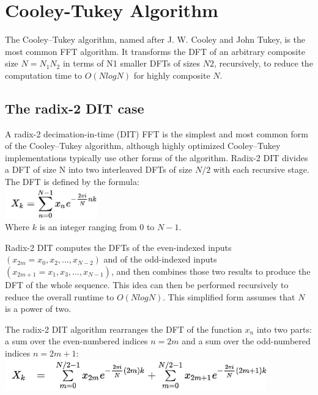 \documentclass[12pt,a4paper]{article}
\begin{document}
\section{Cooley-Tukey Algorithm}\label{sec2}
\hspace{0.5cm} The Cooley–Tukey algorithm, named after J. W. Cooley and John Tukey, is the most common FFT algorithm. It transforms the DFT of an arbitrary composite size $N=N_{1}N_{2}$ in terms of N1 smaller DFTs of sizes $N2$, recursively, to reduce the computation time to $O(N log N)$ for highly composite $N$.

\subsection{The radix-2 DIT case}
\hspace{0.5cm} A radix-2 decimation-in-time (DIT) FFT is the simplest and most common form of the Cooley–Tukey algorithm, although highly optimized Cooley–Tukey implementations typically use other forms of the algorithm. Radix-2 DIT divides a DFT of size N into two interleaved DFTs of size $N/2$ with each recursive stage. The DFT is defined by the formula:\\
\includegraphics[width=0.3\textwidth]{figures/DFT formula.png}\\
Where $k$ is an integer ranging from $0$ to $N-1$.

Radix-2 DIT computes the DFTs of the even-indexed inputs $(x_{2m}=x_{0},x_{2},\ldots ,x_{N-2})$ and of the odd-indexed inputs $(x_{2m+1}=x_{1},x_{3},\ldots ,x_{N-1})$, and then combines those two results to produce the DFT of the whole sequence. This idea can then be performed recursively to reduce the overall runtime to $O(NlogN)$. This simplified form assumes that $N$ is a power of two. 

The radix-2 DIT algorithm rearranges the DFT of the function $x_{n}$ into two parts: a sum over the even-numbered indices $n=2m$ and a sum over the odd-numbered indices $n=2m+1$:\\
\includegraphics[width=0.85\textwidth]{figures/DFT simplification 1.png}
\end{document}
